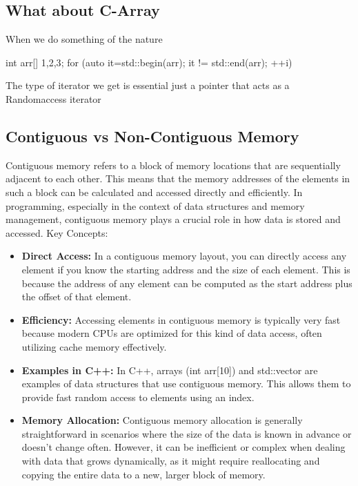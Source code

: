 \documentclass{report}
\begin{document}
\begin{concept}
    \bigbreak \noindent 
    \subsection{What about C-Array}
    \bigbreak \noindent 
    When we do something of the nature
    \bigbreak \noindent 
    \begin{cppcode}
        int arr[] {1,2,3};
        for (auto it=std::begin(arr); it != std::end(arr); ++i) { }
    \end{cppcode}
    \bigbreak \noindent 
    The type of iterator we get is essential just a pointer that acts as a Randomaccess iterator

    \pagebreak
    \subsection{Contiguous vs Non-Contiguous Memory}
    \bigbreak \noindent 
    \begin{concept}
       Contiguous memory refers to a block of memory locations that are sequentially adjacent to each other. This means that the memory addresses of the elements in such a block can be calculated and accessed directly and efficiently. In programming, especially in the context of data structures and memory management, contiguous memory plays a crucial role in how data is stored and accessed. 
       \bigbreak \noindent 
       Key Concepts:
       \begin{itemize}
            \item \textbf{Direct Access:} In a contiguous memory layout, you can directly access any element if you know the starting address and the size of each element. This is because the address of any element can be computed as the start address plus the offset of that element.
            \item \textbf{Efficiency:} Accessing elements in contiguous memory is typically very fast because modern CPUs are optimized for this kind of data access, often utilizing cache memory effectively.
            \item \textbf{Examples in C++:} In C++, arrays (int arr[10]) and std::vector are examples of data structures that use contiguous memory. This allows them to provide fast random access to elements using an index.
            \item \textbf{Memory Allocation:} Contiguous memory allocation is generally straightforward in scenarios where the size of the data is known in advance or doesn't change often. However, it can be inefficient or complex when dealing with data that grows dynamically, as it might require reallocating and copying the entire data to a new, larger block of memory.

\end{itemize}
\end{concept}
\end{concept}
\end{document}
